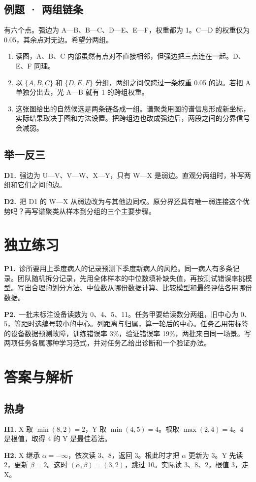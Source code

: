 \documentclass[UTF8,a4paper,11pt]{ctexart}
\newcommand{\CompactQuestion}[2]{\par\noindent\textbf{#1.}\ #2\par\vspace{.8em}}
\begin{document}
\subsection{例题 · 两组链条}
有六个点。强边为 A—B、B—C、D—E、E—F，权重都为 1。C—D 的权重仅为 0.05，其余点对无边。希望分两组。

\begin{enumerate}
\item 读图，A、B、C 内部虽然有点对不直接相邻，但强边把三点连在一起。D、E、F 同理。
\item 以 $\{A,B,C\}$ 和 $\{D,E,F\}$ 分组，两组之间仅跨过一条权重 0.05 的边。若把 A 单独分出去，光 A—B 就有 1 的跨组权重。
\item 这张图给出的自然候选是两条链各成一组。谱聚类用图的谱信息形成新坐标，实际结果取决于图和方法设置。把跨组边也改成强边后，两段之间的分界信号会减弱。
\end{enumerate}
\subsection{举一反三}
\CompactQuestion{D1}{强边为 U—V、V—W、X—Y，只有 W—X 是弱边。直观分两组时，补写两组和它们之间的边。}
\CompactQuestion{D2}{把 D1 的 W—X 从弱边改为与其他边同权。原分界还具有唯一弱连接这个优势吗？再写谱聚类从样本到分组的三个主要步骤。}
\clearpage
\section{独立练习}
\CompactQuestion{P1}{诊所要用上季度病人的记录预测下季度新病人的风险。同一病人有多条记录。团队随机拆分记录，先用全体样本的中位数填补缺失值，再按测试错误率挑模型。写出合理的划分方法、中位数从哪份数据计算、比较模型和最终评估各用哪份数据。}
\CompactQuestion{P2}{一批未标注设备读数为 0、4、5、11。任务甲要给读数分两组，旧中心为 0、5，等距时选编号较小的中心。列距离与归属，算一轮后的中心。任务乙用带标签的设备数据预测故障，训练错误率 3\%，验证错误率 19\%，两批来自同一场景。写两项任务各属哪种学习范式，并对任务乙给出诊断和一个验证办法。}
\clearpage
\section{答案与解析}
\subsection{热身}
\textbf{H1.} X 取 $\min(8,2)=2$，Y 取 $\min(4,5)=4$。根取 $\max(2,4)=4$。4 是根值，取得 4 的 Y 是最佳着法。

\textbf{H2.} X 继承 $\alpha=-\infty$，依次读 3、8，返回 3。根此时才把 $\alpha$ 更新为 3。Y 先读 2，更新 $\beta=2$。这时 $(\alpha,\beta)=(3,2)$，跳过 10。实际读 3、8、2，根值 3，走 X。
\end{document}
